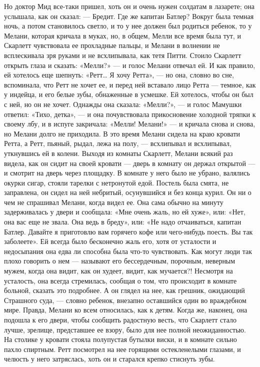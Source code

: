 Но доктор Мид все-таки пришел, хоть он и очень нужен солдатам в лазарете; она услышала, как он сказал:
— Бредит. Где же капитан Батлер?
Вокруг была темная ночь, а потом становилось светло, и то у нее должен был родиться ребенок, то у Мелани, которая кричала в муках, но, в общем, Мелли все время была тут, и Скарлетт чувствовала ее прохладные пальцы, и Мелани в волнении не всплескивала зря руками и не всхлипывала, как тетя Питти. Стоило Скарлетт открыть глаза и сказать: «Мелли?» — и голос Мелани отвечал ей. И как правило, ей хотелось еще шепнуть: «Ретт… Я хочу Ретта», — но она, словно во сне, вспоминала, что Ретт не хочет ее, и перед ней вставало лицо Ретта — темное, как у индейца, и его белые зубы, обнаженные в усмешке. Ей хотелось, чтобы он был с ней, но он не хочет.
Однажды она сказала: «Мелли?», — и голос Мамушки ответил:
«Тихо, детка», — и она почувствовала прикосновение холодной тряпки к своему лбу, и в испуге закричала: «Мелли! Мелани!» — и кричала снова и снова, но Мелани долго не приходила. В это время Мелани сидела на краю кровати Ретта, а Ретт, пьяный, рыдал, лежа на полу, — всхлипывал и всхлипывал, уткнувшись ей в колени.
Выходя из комнаты Скарлетт, Мелани всякий раз видела, как он сидит на своей кровати — дверь в комнату он держал открытой — и смотрит на дверь через площадку. В комнате у него было не убрано, валялись окурки сигар, стояли тарелки с нетронутой едой. Постель была смята, не заправлена, он сидел на ней небритый, осунувшийся и без конца курил. Он ни о чем не спрашивал Мелани, когда видел ее. Она сама обычно на минуту задерживалась у двери и сообщала: «Мне очень жаль, но ей хуже», или:
«Нет, она вас еще не звала. Она ведь в бреду», или: «Не надо отчаиваться, капитан Батлер. Давайте я приготовлю вам горячего кофе или чего-нибудь поесть. Вы так заболеете».
Ей всегда было бесконечно жаль его, хотя от усталости и недосыпания она едва ли способна была что-то чувствовать. Как могут люди так плохо говорить о нем — называют его бессердечным, порочным, неверным мужем, когда она видит, как он худеет, видит, как мучается?! Несмотря на усталость, она всегда стремилась, сообщая о том, что происходит в комнате больной, сказать это подробнее. А он глядел на нее, как грешник, ожидающий Страшного суда, — словно ребенок, внезапно оставшийся один во враждебном мире. Правда, Мелани ко всем относилась, как к детям.
Когда же, наконец, она подошла к его двери, чтобы сообщить радостную весть, что Скарлетт стало лучше, зрелище, представшее ее взору, было для нее полной неожиданностью. На столике у кровати стояла полупустая бутылки виски, и в комнате сильно пахло спиртным. Ретт посмотрел на нее горящими остекленелыми глазами, и челюсть у него затряслась, хоть он и старался крепко стиснуть зубы.

